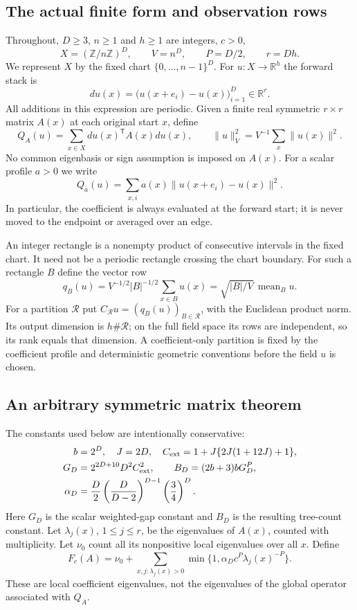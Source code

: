 \documentclass[11pt]{article}
\newcommand{\R}{\mathbb R}
\newcommand{\Z}{\mathbb Z}
\newcommand{\mean}{\operatorname{mean}}
\newcommand{\normn}[1]{\|#1\|_{V}}
\begin{document}
\subsection{The actual finite form and observation rows}
Throughout, $D\ge3$, $n\ge1$ and $h\ge1$ are integers, $c>0$,
\[
 X=(\Z/n\Z)^D,\qquad V=n^D,\qquad P=D/2,\qquad r=Dh.
\]
We represent $X$ by the fixed chart $\{0,\ldots,n-1\}^D$.
For $u:X\to\R^h$ the forward stack is
\[
 du(x)=\bigl(u(x+e_i)-u(x)\bigr)_{i=1}^D\in\R^r.
\]
All additions in this expression are periodic. Given a finite real symmetric
$r\times r$ matrix $A(x)$ at each original start $x$, define
\begin{equation}\label{eq:actual}
 Q_A(u)=\sum_{x\in X}du(x)^{\mathsf T}A(x)du(x),
 \qquad \normn{u}^2=V^{-1}\sum_x\|u(x)\|^2.
\end{equation}
No common eigenbasis or sign assumption is imposed on $A(x)$.
For a scalar profile $a>0$ we write
\[
 Q_a(u)=\sum_{x,i}a(x)\|u(x+e_i)-u(x)\|^2.
\]
In particular, the coefficient is always evaluated at the forward start;
it is never moved to the endpoint or averaged over an edge.

An integer rectangle is a nonempty product of consecutive intervals in the
fixed chart. It need not be a periodic rectangle crossing the chart boundary.
For such a rectangle $B$ define the vector row
\begin{equation}\label{eq:rows}
 q_B(u)=V^{-1/2}|B|^{-1/2}\sum_{x\in B}u(x)
       =\sqrt{|B|/V}\,\mean_B u.
\end{equation}
For a partition $\mathcal R$ put
$C_{\mathcal R}u=(q_B(u))_{B\in\mathcal R}$, with the Euclidean product norm.
Its output dimension is $h\#\mathcal R$; on the full field space its rows
are independent, so its rank equals that dimension. A coefficient-only
partition is fixed by the coefficient profile and deterministic geometric
conventions before the field $u$ is chosen.

\subsection{An arbitrary symmetric matrix theorem}
The constants used below are intentionally conservative:
\begin{align}\label{eq:constants}
 b&=2^D,\quad J=2D,\quad
 C_{\rm ext}=1+J\{2J(1+12J)+1\},\nonumber\\
 G_D&=2^{2D+10}D^2C_{\rm ext}^2,\qquad
 B_D=(2b+3)bG_D^P,\\
 \alpha_D&=\frac D2\left(\frac D{D-2}\right)^{D-1}
                      \left(\frac34\right)^D.\nonumber
\end{align}
Here $G_D$ is the scalar weighted-gap constant and $B_D$ is the resulting
tree-count constant. Let $\lambda_j(x)$, $1\le j\le r$, be the eigenvalues
of $A(x)$, counted with multiplicity. Let $\nu_0$ count all its nonpositive
local eigenvalues over all $x$. Define
\begin{equation}\label{eq:cap}
 F_c(A)=\nu_0+
 \sum_{x,j:\lambda_j(x)>0}
       \min\{1,\alpha_D c^P\lambda_j(x)^{-P}\}.
\end{equation}
These are local coefficient eigenvalues, not the eigenvalues of the global
operator associated with $Q_A$.
\end{document}
